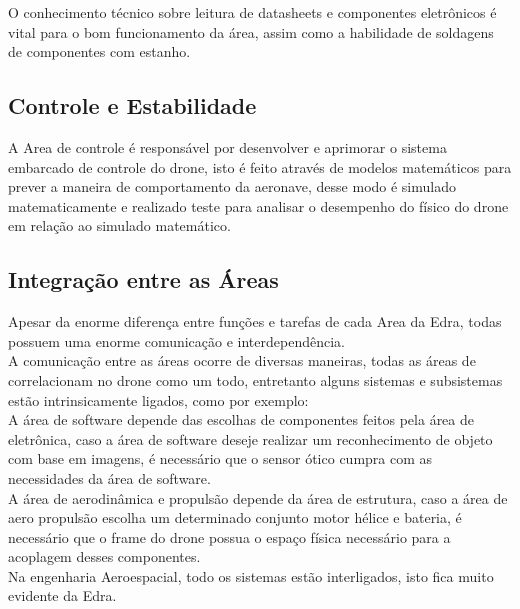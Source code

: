 O conhecimento técnico sobre leitura de datasheets e componentes eletrônicos é vital para o bom funcionamento da área, assim como a habilidade de soldagens de componentes com estanho. \\[0.2cm]





\subsection{Controle e Estabilidade}

A Area de controle é responsável por desenvolver e aprimorar o sistema embarcado de controle do drone, isto é feito através de modelos matemáticos para prever a maneira de comportamento da aeronave, desse modo é simulado matematicamente e realizado teste para analisar o desempenho do físico do drone em relação ao simulado matemático. \\[0.2cm]



\subsection{Integração entre as Áreas}



Apesar da enorme diferença entre funções e tarefas de cada Area da Edra, todas possuem uma enorme comunicação e interdependência. \\[0.2cm]

A comunicação entre as áreas ocorre de diversas maneiras, todas as áreas de correlacionam no drone como um todo, entretanto alguns sistemas e subsistemas estão intrinsicamente ligados, como por exemplo: \\[0.2cm]

A área de software depende das escolhas de componentes feitos pela área de eletrônica, caso a área de software deseje realizar um reconhecimento de objeto com base em imagens, é necessário que o sensor ótico cumpra com as necessidades da área de software. \\[0.2cm]

A área de aerodinâmica e propulsão depende da área de estrutura, caso a área de aero propulsão escolha um determinado conjunto motor hélice e bateria, é necessário que o frame do drone possua o espaço física necessário para a acoplagem desses componentes.
\\[0.2cm]


Na engenharia Aeroespacial, todo os sistemas estão interligados, isto fica muito evidente da Edra.\\[0.2cm]




